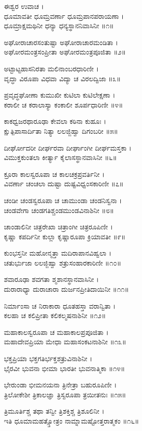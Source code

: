 ಈಶ್ವರ ಉವಾಚ ।\\
ಧೂಮಾವತೀ ಧೂಮ್ರವರ್ಣಾ ಧೂಮ್ರಪಾನಪರಾಯಣಾ ।\\
ಧೂಮ್ರಾಕ್ಷಮಥಿನೀ ಧನ್ಯಾ ಧನ್ಯಸ್ಥಾನನಿವಾಸಿನೀ ॥೧॥

ಅಘೋರಾಚಾರಸಂತುಷ್ಟಾ ಅಘೋರಾಚಾರಮಂಡಿತಾ ।\\
ಅಘೋರಮಂತ್ರಸಂಪ್ರೀತಾ ಅಘೋರಮಂತ್ರಪೂಜಿತಾ ॥೨॥

ಅಟ್ಟಾಟ್ಟಹಾಸನಿರತಾ ಮಲಿನಾಂಬರಧಾರಿಣೀ ।\\
ವೃದ್ಧಾ ವಿರೂಪಾ ವಿಧವಾ ವಿದ್ಯಾ ಚ ವಿರಲದ್ವಿಜಾ ॥೩॥

ಪ್ರವೃದ್ಧಘೋಣಾ ಕುಮುಖೀ ಕುಟಿಲಾ ಕುಟಿಲೇಕ್ಷಣಾ ।\\
ಕರಾಲೀ ಚ ಕರಾಲಾಸ್ಯಾ ಕಂಕಾಲೀ ಶೂರ್ಪಧಾರಿಣೀ ॥೪॥

ಕಾಕಧ್ವಜರಥಾರೂಢಾ ಕೇವಲಾ ಕಠಿನಾ ಕುಹೂಃ ।\\
ಕ್ಷುತ್ಪಿಪಾಸಾರ್ದಿತಾ ನಿತ್ಯಾ ಲಲಜ್ಜಿಹ್ವಾ ದಿಗಂಬರೀ ॥೫॥

ದೀರ್ಘೋದರೀ ದೀರ್ಘರವಾ ದೀರ್ಘಾಂಗೀ ದೀರ್ಘಮಸ್ತಕಾ ।\\
ವಿಮುಕ್ತಕುಂತಲಾ ಕೀರ್ತ್ಯಾ ಕೈಲಾಸಸ್ಥಾನವಾಸಿನೀ ॥೬॥

ಕ್ರೂರಾ ಕಾಲಸ್ವರೂಪಾ ಚ ಕಾಲಚಕ್ರಪ್ರವರ್ತಿನೀ ।\\
ವಿವರ್ಣಾ ಚಂಚಲಾ ದುಷ್ಟಾ ದುಷ್ಟವಿಧ್ವಂಸಕಾರಿಣೀ ॥೭॥

ಚಂಡೀ ಚಂಡಸ್ವರೂಪಾ ಚ ಚಾಮುಂಡಾ ಚಂಡನಿಸ್ವನಾ ।\\
ಚಂಡವೇಗಾ ಚಂಡಗತಿಶ್ಚಂಡಮುಂಡವಿನಾಶಿನೀ ॥೮॥

ಚಾಂಡಾಲಿನೀ ಚಿತ್ರರೇಖಾ ಚಿತ್ರಾಂಗೀ ಚಿತ್ರರೂಪಿಣೀ ।\\
ಕೃಷ್ಣಾ ಕಪರ್ದಿನೀ ಕುಲ್ಲಾ ಕೃಷ್ಣಾರೂಪಾ ಕ್ರಿಯಾವತೀ ॥೯॥

ಕುಂಭಸ್ತನೀ ಮಹೋನ್ಮತ್ತಾ ಮದಿರಾಪಾನವಿಹ್ವಲಾ ।\\
ಚತುರ್ಭುಜಾ ಲಲಜ್ಜಿಹ್ವಾ ಶತ್ರುಸಂಹಾರಕಾರಿಣೀ ॥೧೦॥

ಶವಾರೂಢಾ ಶವಗತಾ ಶ್ಮಶಾನಸ್ಥಾನವಾಸಿನೀ ।\\
ದುರಾರಾಧ್ಯಾ ದುರಾಚಾರಾ ದುರ್ಜನಪ್ರೀತಿದಾಯಿನೀ ॥೧೧॥

ನಿರ್ಮಾಂಸಾ ಚ ನಿರಾಕಾರಾ ಧೂತಹಸ್ತಾ ವರಾನ್ವಿತಾ ।\\
ಕಲಹಾ ಚ ಕಲಿಪ್ರೀತಾ ಕಲಿಕಲ್ಮಷನಾಶಿನೀ ॥೧೨॥

ಮಹಾಕಾಲಸ್ವರೂಪಾ ಚ ಮಹಾಕಾಲಪ್ರಪೂಜಿತಾ ।\\
ಮಹಾದೇವಪ್ರಿಯಾ ಮೇಧಾ ಮಹಾಸಂಕಟನಾಶಿನೀ ॥೧೩॥

ಭಕ್ತಪ್ರಿಯಾ ಭಕ್ತಗತಿರ್ಭಕ್ತಶತ್ರುವಿನಾಶಿನೀ ।\\
ಭೈರವೀ ಭುವನಾ ಭೀಮಾ ಭಾರತೀ ಭುವನಾತ್ಮಿಕಾ ॥೧೪॥

ಭೇರುಂಡಾ ಭೀಮನಯನಾ ತ್ರಿನೇತ್ರಾ ಬಹುರೂಪಿಣೀ ।\\
ತ್ರಿಲೋಕೇಶೀ ತ್ರಿಕಾಲಜ್ಞಾ ತ್ರಿಸ್ವರೂಪಾ ತ್ರಯೀತನುಃ ॥೧೫॥

ತ್ರಿಮೂರ್ತಿಶ್ಚ ತಥಾ ತನ್ವೀ ತ್ರಿಶಕ್ತಿಶ್ಚ ತ್ರಿಶೂಲಿನೀ ।\\
ಇತಿ ಧೂಮಾಮಹತ್ಸ್ತೋತ್ರಂ ನಾಮ್ನಾಮಷ್ಟೋತ್ತರಾತ್ಮಕಂ ॥೧೬॥


